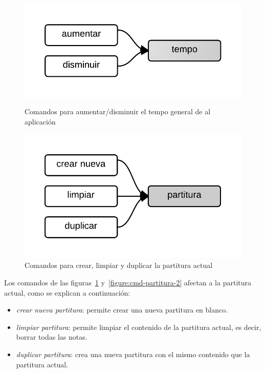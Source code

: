 \begin{figure}[H]
\begin{minipage}[b]{0.5\linewidth}
\centering
\includegraphics[width=0.6\linewidth]{./graphics/cmd-tempo.png}
\caption{Comandos para aumentar/disminuir el tempo general de al aplicaci\'on}
\label{figure:cmd-tempo}
\end{minipage}
\quad
\begin{minipage}[b]{0.5\linewidth}
\centering
\includegraphics[width=0.6\linewidth]{./graphics/partitura-1.png}
\caption{Comandos para crear, limpiar y duplicar la partitura actual}
\label{figure:cmd-partitura-1}
\end{minipage}
\end{figure}

Los comandos de las figuras~\ref{figure:cmd-partitura-1} y~\ref{figure:cmd-partitura-2} afectan a
la partitura actual, como se explican a continuaci\'on:

\begin{itemize}
    \item \emph{crear nueva  partitura}:  permite crear una nueva partitura en blanco.
    \item \emph{limpiar  partitura}: permite limpiar el contenido de la partitura actual, es decir, borrar todas las notas.
    \item \emph{duplicar partitura}: crea una nueva partitura con el mismo contenido que la partitura actual.
\end{itemize}

